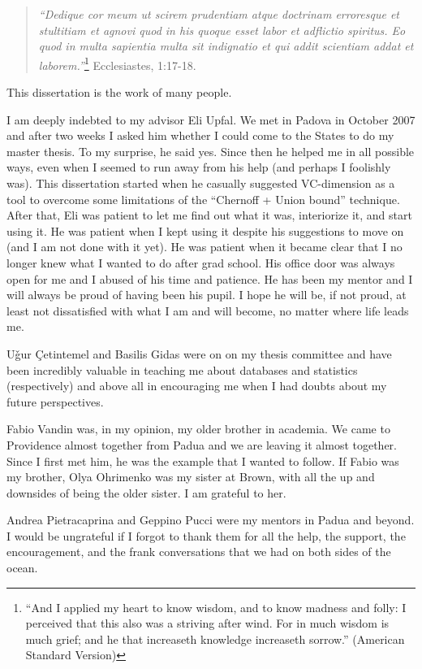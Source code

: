 \begin{quote}
  {\em ``Dedique cor meum ut scirem prudentiam atque doctrinam erroresque et
  stultitiam et agnovi quod in his quoque esset labor et adflictio spiritus. Eo
  quod in multa sapientia multa sit indignatio et qui addit scientiam addat et
  laborem.''}\footnote{``And I applied my heart to know wisdom, and to know madness
  and folly: I perceived that this also was a striving after wind. For in much
  wisdom is much grief; and he that increaseth knowledge increaseth sorrow.'' 
  (American Standard Version)} Ecclesiastes, 1:17-18.
\end{quote}

This dissertation is the work of many people.

I am deeply indebted to my advisor Eli Upfal. We met in Padova in October 2007
and after two weeks I asked him whether I could come to the States to do my
master thesis. To my surprise, he said yes. Since then he helped me in all
possible ways, even when I seemed to run away from his help (and perhaps I
foolishly was). This dissertation started when he casually suggested
VC-dimension as a tool to overcome some limitations of the ``Chernoff + Union
bound'' technique. After that, Eli was patient to let me find out what it was,
interiorize it, and start using it. He was patient when I kept using it despite
his suggestions to move on (and I am not done with it yet). He was patient when
it became clear that I no longer knew what I wanted to do after grad school. His
office door was always open for me and I abused of his time and patience. He has
been my mentor and I will always be proud of having been his pupil. I hope he
will be, if not proud, at least not dissatisfied with what I am and will become,
no matter where life leads me.  

U\v{g}ur \c{C}etintemel and Basilis Gidas were on on my thesis committee and have
been incredibly valuable in teaching me about databases and statistics
(respectively) and above all in encouraging me when I had doubts about my future
perspectives.

Fabio Vandin was, in my opinion, my older brother in academia. We came to
Providence almost together from Padua and we are leaving it almost together.
Since I first met him, he was the example that I wanted to follow. If Fabio was
my brother, Olya Ohrimenko was my sister at Brown, with all the up and downsides
of being the older sister. I am grateful to her.

Andrea Pietracaprina and Geppino Pucci were my mentors in Padua and beyond. I
would be ungrateful if I forgot to thank them for all the help, the support, the
encouragement, and the frank conversations that we had on both sides of the
ocean.


